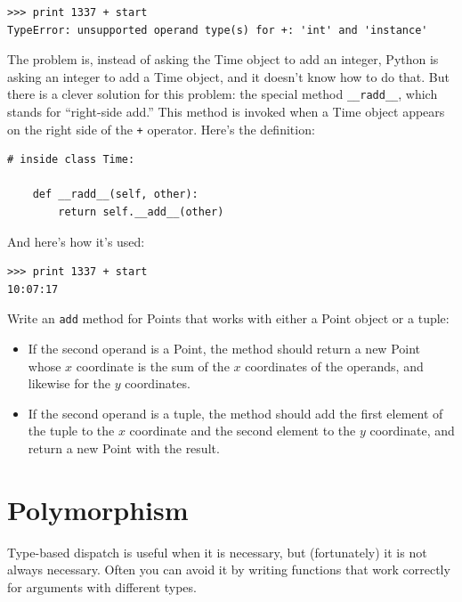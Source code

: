 \documentclass[10pt]{book}
\begin{document}

\beforeverb
\begin{verbatim}
>>> print 1337 + start
TypeError: unsupported operand type(s) for +: 'int' and 'instance'
\end{verbatim}
\afterverb
%
The problem is, instead of asking the Time object to add an integer,
Python is asking an integer to add a Time object, and it doesn't know
how to do that.  But there is a clever solution for this problem: the
special method \verb"__radd__", which stands for ``right-side add.''
This method is invoked when a Time object appears on the right side of
the {\tt +} operator.  Here's the definition:


\beforeverb
\begin{verbatim}
# inside class Time:

    def __radd__(self, other):
        return self.__add__(other)
\end{verbatim}
\afterverb
%
And here's how it's used:

\beforeverb
\begin{verbatim}
>>> print 1337 + start
10:07:17
\end{verbatim}
\afterverb
%

\begin{ex}
Write an {\tt add} method for Points that works with either a
Point object or a tuple:  

\begin{itemize}

\item If the second operand is a Point, the method should return a new
Point whose $x$ coordinate is the sum of the $x$ coordinates of the
operands, and likewise for the $y$ coordinates.

\item If the second operand is a tuple, the method should add the
first element of the tuple to the $x$ coordinate and the second
element to the $y$ coordinate, and return a new Point with the result. 

\end{itemize}

\end{ex}

\section{Polymorphism}

Type-based dispatch is useful when it is necessary, but (fortunately)
it is not always necessary.  Often you can avoid it by writing functions
that work correctly for arguments with different types.
\end{document}
